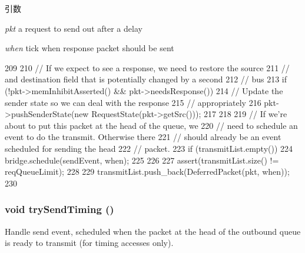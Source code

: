 \begin{DoxyParams}{引数}
\item[{\em pkt}]a request to send out after a delay \item[{\em when}]tick when response packet should be sent \end{DoxyParams}



\begin{DoxyCode}
209 {
210     // If we expect to see a response, we need to restore the source
211     // and destination field that is potentially changed by a second
212     // bus
213     if (!pkt->memInhibitAsserted() && pkt->needsResponse()) {
214         // Update the sender state so we can deal with the response
215         // appropriately
216         pkt->pushSenderState(new RequestState(pkt->getSrc()));
217     }
218 
219     // If we're about to put this packet at the head of the queue, we
220     // need to schedule an event to do the transmit.  Otherwise there
221     // should already be an event scheduled for sending the head
222     // packet.
223     if (transmitList.empty()) {
224         bridge.schedule(sendEvent, when);
225     }
226 
227     assert(transmitList.size() != reqQueueLimit);
228 
229     transmitList.push_back(DeferredPacket(pkt, when));
230 }
\end{DoxyCode}
\hypertarget{classBridge_1_1BridgeMasterPort_a391c414b53eb45782e37bc539608e477}{
\subsubsection[{trySendTiming}]{\setlength{\rightskip}{0pt plus 5cm}void trySendTiming ()}}
\label{classBridge_1_1BridgeMasterPort_a391c414b53eb45782e37bc539608e477}
Handle send event, scheduled when the packet at the head of the outbound queue is ready to transmit (for timing accesses only). 


